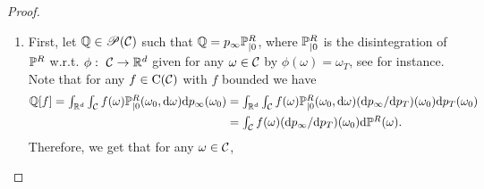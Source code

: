 \begin{proof}
\begin{enumerate}[wide, labelwidth=!, labelindent=0pt, label=(\alph*)]
        Note that
        $(\rmd p_T / \rmd p_\infty) = \Pbb_{T|0} [\rmd p_0 / \rmd
        p_\infty]$ and that for any $\mu \in \Pens(\rset^d)$ with
        $\KL{\mu}{p_\infty} < +\infty$ we have
        $\Ent{p_\infty}{\rmd \mu / \rmd p_\infty} =
        \KLLigne{\mu}{p_\infty}$. Using these results, \eqref{eq:pinsker} and 
        \eqref{eq:entropy_decay} we get that
        \begin{equation}
          \label{eq:first_bound_kl}
        \tvnormLigne{p_0 \Pbb_{T|0}- p_{\infty}} \leq \sqrt{2} \exp[-T] \KLLignesqrt{p_0}{p_\infty}  . 
      \end{equation}
      In addition, we have that
      \begin{equation}
        \textstyle{
          \KLLigne{p_0}{p_\infty} = (d/2) \log(2 \uppi) + \int_{\rset^d} \normLigne{x}^2 \rmd p_0(x) - \mathrm{H}(p_0)  ,
          }
        \end{equation}
        where $\mathrm{H}(p_0) = - \int_{\rset^d} \log(p_0(x)) p_0(x) \rmd x$.
        Combining this result and \eqref{eq:first_bound_kl} we get that
        \begin{equation}
          \label{eq:first_bound_kl_clop}
          \textstyle{
            \tvnormLigne{p_0 \Pbb_{T|0}- p_{\infty}} \leq \sqrt{2} \exp[-T] ((d/2) \log(2 \uppi) + \int_{\rset^d} \normLigne{x}^2 \rmd p_0(x) - \mathrm{H}(p_0))^{1/2}   ,
            }
          \end{equation}
          which concludes the first part of the proof.
        \item First, let $\mathbb{Q} \in \mathscr{P}(\mathcal{C})$ such that
          $\mathbb{Q} = p_\infty \mathbb{P}^R_{|0}$, where $\mathbb{P}^R_{|0}$ is the
          disintegration of $\mathbb{P}^R$ w.r.t. $\phi: \ \mathcal{C} \to \mathbb{R}^d$
          given for any $\omega \in \mathcal{C}$ by $\phi(\omega) = \omega_T$,
          see \cite{leonard2014some} for instance. Note that for any
          $f \in \mathrm{C}(\mathcal{C})$ with $f$ bounded we have
      \begin{align}
        \textstyle{
        \mathbb{Q}[f] = \int_{\mathbb{R}^d} \int_{\mathcal{C}} f(\omega) \mathbb{P}^{R}_{|0}(\omega_0, \mathrm{d}\omega) \mathrm{d}p_\infty(\omega_0)} &= \textstyle{\int_{\mathbb{R}^d} \int_{\mathcal{C}} f(\omega) \mathbb{P}^{R}_{|0}(\omega_0, \mathrm{d}\omega) (\mathrm{d}p_\infty / \mathrm{d}p_T)(\omega_0)\mathrm{d}p_T(\omega_0) } \\
&= \textstyle{\int_{\mathcal{C}}f(\omega) (\mathrm{d}p_\infty / \mathrm{d}p_T)(\omega_0) \mathrm{d}\mathbb{P}^R(\omega)}  . 
      \end{align}
      Therefore, we get that for any $\omega \in \mathcal{C}$,

\end{enumerate}
\end{proof}

